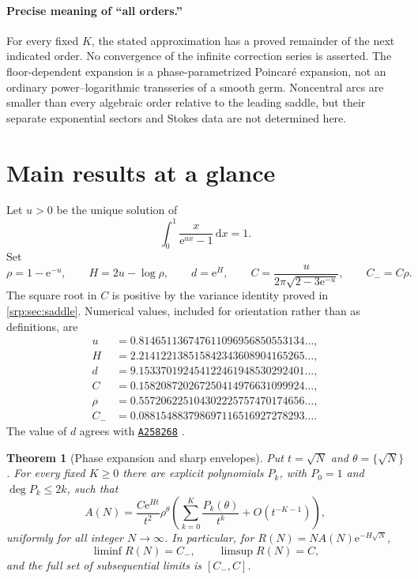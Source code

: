 \documentclass[11pt,a4paper]{article}
\numberwithin{equation}{section}
\newtheorem{theorem}{Theorem}[section]
\theoremstyle{definition}
\theoremstyle{remark}
\newcommand{\dd}{\,\mathrm d}
\newcommand{\e}{\mathrm e}
\newcommand{\oeis}[1]{\href{https://oeis.org/#1}{\texttt{#1}}}
\begin{document}
\paragraph{Precise meaning of ``all orders.''}
For every fixed $K$, the stated approximation has a proved remainder
of the next indicated order. No convergence of the infinite correction
series is asserted. The floor-dependent expansion is a phase-parametrized
Poincar\'e expansion, not an ordinary power--logarithmic transseries of a
smooth germ. Noncentral arcs are smaller than every algebraic order
relative to the leading saddle, but their separate exponential sectors
and Stokes data are not determined here.

\section{Main results at a glance}
\label{srp:sec:main}

Let $u>0$ be the unique solution of
\begin{equation}
 \int_0^1\frac{x}{\e^{ux}-1}\dd x=1.
 \label{srp:eq:u-one}
\end{equation}
Set
\begin{equation}
 \rho=1-\e^{-u},\qquad
 H=2u-\log\rho,\qquad d=\e^H,\qquad
 C=\frac{u}{2\pi\sqrt{2-3\e^{-u}}},\qquad C_-=C\rho.
 \label{srp:eq:constants-one}
\end{equation}
The square root in $C$ is positive by the variance identity proved in
\cref{srp:sec:saddle}. Numerical values, included for orientation rather
than as definitions, are
\begin{align*}
 u&=0.814651136747611096956850553134\ldots,\\
 H&=2.214122138515842343608904165265\ldots,\\
 d&=9.153370192454122461948530292401\ldots,\\
 C&=0.158208720267250414976631099924\ldots,\\
 \rho&=0.557206225104302225757470174656\ldots,\\
 C_-&=0.088154883798697116516927278293\ldots.
\end{align*}
The value of $d$ agrees with \oeis{A258268} \cite{oeisD}.

\begin{theorem}[Phase expansion and sharp envelopes]
\label{srp:thm:main-phase}
Put $t=\sqrt N$ and $\theta=\{\sqrt N\}$. For every fixed $K\ge0$ there are
explicit polynomials $P_k$, with $P_0=1$ and $\deg P_k\le2k$, such that
\begin{equation}
 A(N)=\frac{C\e^{Ht}}{t^2}\rho^\theta
 \left(\sum_{k=0}^K\frac{P_k(\theta)}{t^k}
       +O(t^{-K-1})\right),
 \label{srp:eq:main-phase}
\end{equation}
uniformly for all integer $N\to\infty$. In particular, for
$R(N)=N A(N)\e^{-H\sqrt N}$,
\begin{equation}
 \liminf R(N)=C_-,\qquad \limsup R(N)=C,
 \label{srp:eq:sharp-limits}
\end{equation}
and the full set of subsequential limits is $[C_-,C]$.
\end{theorem}
\end{document}
